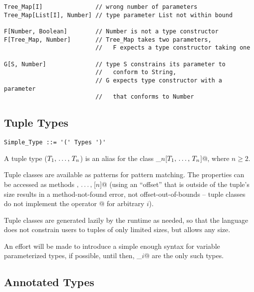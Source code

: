 \begin{lstlisting}
Tree_Map[I]               // wrong number of parameters
Tree_Map[List[I], Number] // type parameter List not within bound

F[Number, Boolean]        // Number is not a type constructor
F[Tree_Map, Number]       // Tree_Map takes two parameters, 
                          //   F expects a type constructor taking one

G[S, Number]              // type S constrains its parameter to
                          //   conform to String, 
                          // G expects type constructor with a parameter
                          //   that conforms to Number
\end{lstlisting}





\subsection{Tuple Types}
\label{sec:tuple-types}

\syntax\begin{lstlisting}
Simple_Type ::= '(' Types ')'
\end{lstlisting}

A tuple type ($T_1 ,\, \ldots ,\, T_n$) is an alias for the class \lstinline@Tuple_$n$[$T_1 ,\, \ldots ,\, T_n$]@, where $n \geq 2$. 

Tuple classes are available as patterns for pattern matching. The properties can be accessed as methods \lstinline@[1]$ ,\, \ldots ,\, $[$n$]@ (using an ``offset'' that is outside of the tuple's size results in a method-not-found error, not offset-out-of-bounds -- tuple classes do not implement the operator \lstinline@[i]@ for arbitrary $i$). 

Tuple classes are generated lazily by the runtime as needed, so that the language does not constrain users to tuples of only limited sizes, but allows any size. 

An effort will be made to introduce a simple enough syntax for variable parameterized types, if possible, until then, \lstinline@Tuple_$i$@ are the only such types. 






\subsection{Annotated Types}

